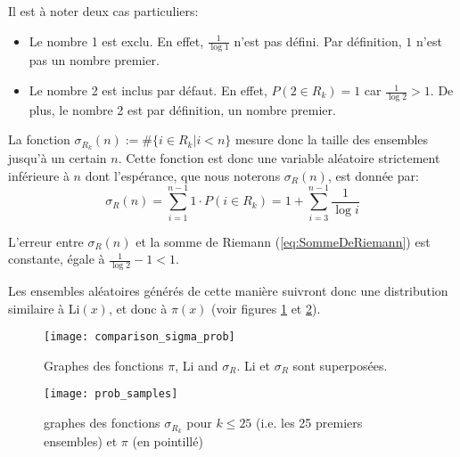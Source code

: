 \documentclass[../main.tex]{report}
\begin{document}
Il est à noter deux cas particuliers:
\begin{itemize} 
    \item Le nombre 1 est exclu. En effet, $\frac{1}{\log 1}$ n'est pas défini. Par définition, $1$ n'est pas un nombre premier.
    \item Le nombre 2 est inclus par défaut. En effet, $P(2 \in R_k) = 1$ car $\frac{1}{\log 2} > 1$. De plus, le nombre 2 est par définition, un nombre premier.
\end{itemize}


La fonction $\sigma_{R_k}(n) := \# \{i \in R_{k} | i < n\}$ mesure donc la taille des ensembles jusqu'à un certain $n$. 
Cette fonction est donc une variable aléatoire strictement inférieure à $n$ 
dont l'espérance, que nous noterons $\sigma_R(n)$, est donnée par:
\[ 
\sigma_R(n) = 
\sum_{i=1}^{n-1} 1 \cdot P(i \in R_k) 
= 1 + \sum_{i=3}^{n-1} \frac{1}{\log i}
\]

L'erreur entre $\sigma_R(n)$ et la somme de Riemann (\ref{eq:SommeDeRiemann}) est constante, égale à
$\frac{1}{\log 2}- 1 < 1$.

Les ensembles aléatoires générés de cette manière suivront donc une distribution similaire à Li$(x)$, et donc à $\pi(x)$
(voir figures \ref{fig:comparison_sigma_prob} et \ref{fig:prob_sample}).

\begin{figure}[H]
\texttt{[image: comparison\_sigma\_prob]}
\caption{Graphes des fonctions $\pi$, Li and $\sigma_R$. Li et $\sigma_R$ sont superposées.}
\label{fig:comparison_sigma_prob}
\end{figure}

\begin{figure}[H]
	\centering
	\texttt{[image: prob\_samples]}
	\caption{graphes des fonctions $\sigma_{R_k}$ pour $k \leq 25$ (i.e. les 25 premiers ensembles) et $\pi$ (en pointillé)}
	\label{fig:prob_sample}
\end{figure}
\end{document}
